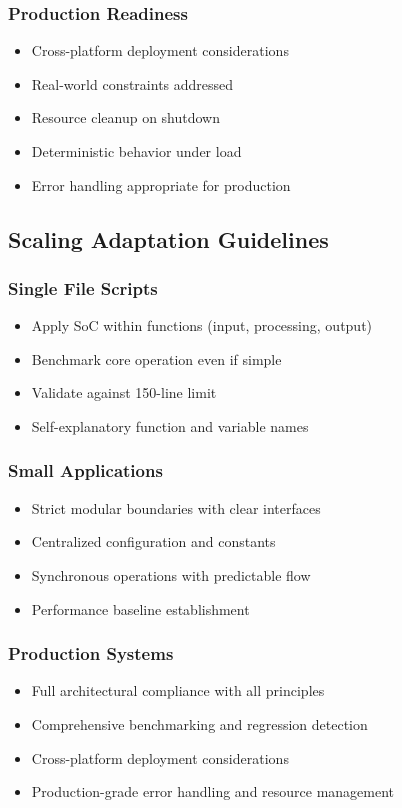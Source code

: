 \documentclass{article}
\begin{document}
\subsubsection{Production Readiness}
\begin{itemize}[noitemsep]
\item Cross-platform deployment considerations
\item Real-world constraints addressed
\item Resource cleanup on shutdown
\item Deterministic behavior under load
\item Error handling appropriate for production
\end{itemize}

\subsection{Scaling Adaptation Guidelines}

\subsubsection{Single File Scripts}
\begin{itemize}[noitemsep]
\item Apply SoC within functions (input, processing, output)
\item Benchmark core operation even if simple
\item Validate against 150-line limit
\item Self-explanatory function and variable names
\end{itemize}

\subsubsection{Small Applications}
\begin{itemize}[noitemsep]
\item Strict modular boundaries with clear interfaces
\item Centralized configuration and constants
\item Synchronous operations with predictable flow
\item Performance baseline establishment
\end{itemize}

\subsubsection{Production Systems}
\begin{itemize}[noitemsep]
\item Full architectural compliance with all principles
\item Comprehensive benchmarking and regression detection
\item Cross-platform deployment considerations
\item Production-grade error handling and resource management
\end{itemize}
\end{document}
